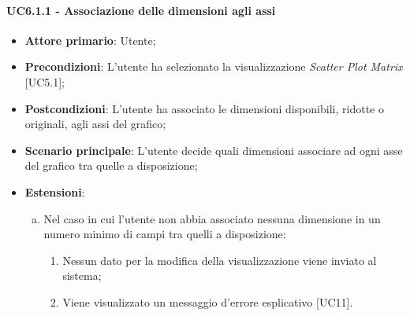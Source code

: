 \paragraph{UC6.1.1 - Associazione delle dimensioni agli assi}
\begin{itemize}
	\item \textbf{Attore primario}: Utente;
	\item \textbf{Precondizioni}: L'utente ha selezionato la visualizzazione \textit{Scatter Plot Matrix} [UC5.1];
	\item \textbf{Postcondizioni}: L'utente ha associato le dimensioni disponibili, ridotte o originali, agli assi del grafico;
	
	\item \textbf{Scenario principale}: L'utente decide quali dimensioni associare ad ogni asse del grafico tra quelle a disposizione;
	
		\item \textbf{Estensioni}:
	\begin{enumerate}[(a)]
		\item Nel caso in cui l'utente non abbia associato nessuna dimensione in un numero minimo di campi tra quelli a disposizione:
		\begin{enumerate}[1.]
			\item Nessun dato per la modifica della visualizzazione viene inviato al sistema;
			\item Viene visualizzato un messaggio d'errore esplicativo [UC11].
		\end{enumerate}
	\end{enumerate}
\end{itemize}